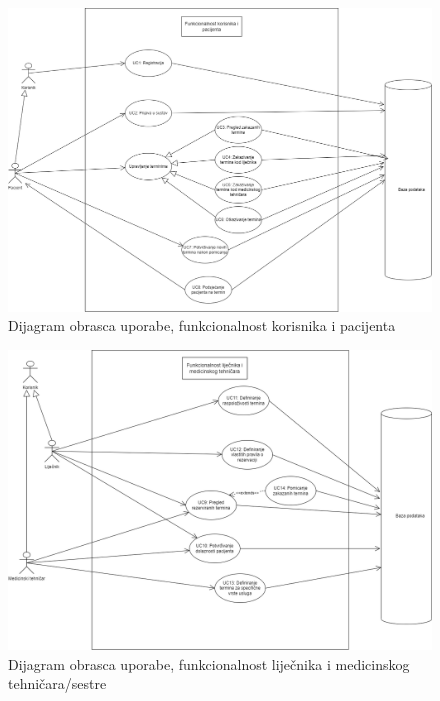 				
					\begin{figure}[H]
			            \includegraphics[width=\textwidth]{slike/pacijent_usecase_v2.png} %
			            \caption{Dijagram obrasca uporabe, funkcionalnost korisnika i pacijenta}
			            \label{fig:promjene2} %
		            \end{figure}
				
				    \begin{figure}[H]
			            \includegraphics[width=\textwidth]{slike/lijecnik_tehn_usecase_v2.png} %
			            \caption{Dijagram obrasca uporabe, funkcionalnost liječnika i medicinskog tehničara/sestre}
			            \label{fig:promjene2} %
		            \end{figure}
				
